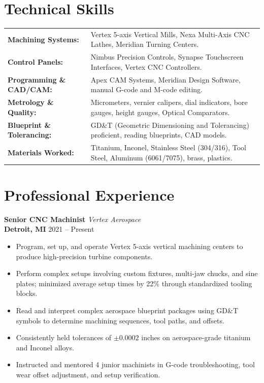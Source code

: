 \documentclass[10pt,letterpaper]{article}
\newcommand{\jobheader}[4]{%
  \textbf{#1} \hfill \textit{#2} \\
  \textbf{\color{darkgray}#3} \hfill \color{darkgray}#4%
}
\begin{document}
\section*{Technical Skills}
\begin{tabularx}{\textwidth}{@{}l X@{}}
    \textbf{Machining Systems:} & Vertex 5-axis Vertical Mills, Nexa Multi-Axis CNC Lathes, Meridian Turning Centers. \\
    \textbf{Control Panels:} & Nimbus Precision Controls, Synapse Touchscreen Interfaces, Vertex CNC Controllers. \\
    \textbf{Programming \& CAD/CAM:} & Apex CAM Systems, Meridian Design Software, manual G-code and M-code editing. \\
    \textbf{Metrology \& Quality:} & Micrometers, vernier calipers, dial indicators, bore gauges, height gauges, Optical Comparators. \\
    \textbf{Blueprint \& Tolerancing:} & GD\&T (Geometric Dimensioning and Tolerancing) proficient, reading blueprints, CAD models. \\
    \textbf{Materials Worked:} & Titanium, Inconel, Stainless Steel (304/316), Tool Steel, Aluminum (6061/7075), brass, plastics.
\end{tabularx}

\section*{Professional Experience}

\jobheader{Senior CNC Machinist}{Vertex Aerospace}{Detroit, MI}{2021 -- Present}
\begin{itemize}
    \item Program, set up, and operate Vertex 5-axis vertical machining centers to produce high-precision turbine components.
    \item Perform complex setups involving custom fixtures, multi-jaw chucks, and sine plates; minimized average setup times by 22\% through standardized tooling blocks.
    \item Read and interpret complex aerospace blueprint packages using GD\&T symbols to determine machining sequences, tool paths, and offsets.
    \item Consistently held tolerances of \(\pm 0.0002\) inches on aerospace-grade titanium and Inconel alloys.
    \item Instructed and mentored 4 junior machinists in G-code troubleshooting, tool wear offset adjustment, and setup verification.
\end{itemize}
\end{document}
